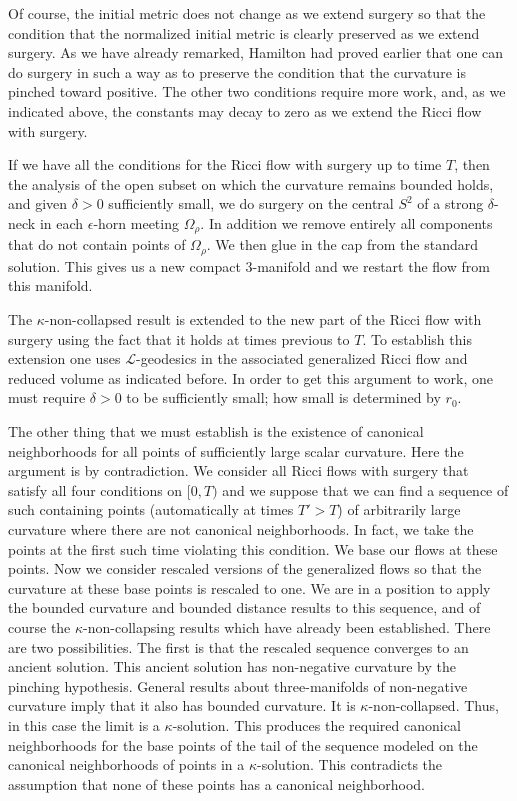 Of course, the initial metric does not change as we extend surgery
so that the condition that the normalized initial metric is clearly
preserved as we extend surgery. As we have already remarked,
Hamilton had proved earlier that one can do surgery in such a way as
to preserve the condition that the curvature is pinched toward
positive. The other two conditions require more work, and, as we
indicated above, the constants may decay to zero as we extend the
Ricci flow with surgery.

If we have all the conditions for the Ricci flow with surgery up to time $T$,
then the analysis of the open subset on which the curvature remains bounded
holds, and given $\delta>0$ sufficiently small, we do surgery on the central
$S^2$ of a strong $\delta$-neck in each $\epsilon$-horn meeting $\Omega_\rho$.
In addition we remove entirely all components that do not contain points of
$\Omega_\rho$. We then glue in the cap from the standard solution. This gives
us a new compact $3$-manifold and we restart the flow from this manifold.

The $\kappa$-non-collapsed result is extended to the new part of the
Ricci flow with surgery using the fact that it holds at times
previous to $T$. To establish this extension one uses ${\mathcal
L}$-geodesics in the associated generalized Ricci flow and reduced
volume as indicated before. In order to get this argument to work,
one must require $\delta>0$ to be sufficiently small; how small is
determined by $r_0$.

The other thing that we must establish is the existence of canonical
neighborhoods for all points of sufficiently large scalar curvature.
Here the argument is by contradiction. We consider all Ricci flows
with surgery that satisfy all four conditions on $[0,T)$ and we
suppose that we can find a sequence of such containing points
(automatically at times $T'>T$) of arbitrarily large curvature where
there are not canonical neighborhoods. In fact, we take the points
at the first such time violating this condition. We base our flows
at these points. Now we consider rescaled versions of the
generalized flows so that the curvature at these base points is
rescaled to one. We are in a position to apply the bounded curvature
and bounded distance results to this sequence, and of course the
$\kappa$-non-collapsing results which have already been established.
There are two possibilities. The first is that the rescaled sequence
converges to an ancient solution. This ancient solution has
non-negative curvature by the pinching hypothesis. General results
about three-manifolds  of non-negative curvature imply that it also
has bounded curvature. It is $\kappa$-non-collapsed. Thus, in this
case the limit is a $\kappa$-solution. This produces the required
canonical neighborhoods for the base points of the tail of the
sequence modeled on the canonical neighborhoods of points in a
$\kappa$-solution. This contradicts the assumption that none of
these points has a canonical neighborhood.


